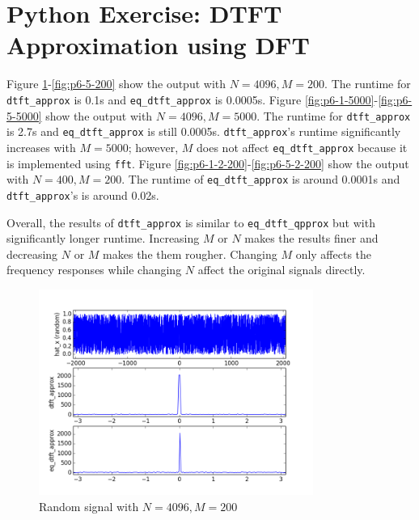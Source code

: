 \section{Python Exercise: DTFT Approximation using DFT}\label{sec:p6}
Figure \ref{fig:p6-1-200}-\ref{fig:p6-5-200} show the output with $N=4096, M=200$. The runtime for \texttt{dtft\_approx} is 0.1s and \texttt{eq\_dtft\_approx} is 0.0005s. Figure \ref{fig:p6-1-5000}-\ref{fig:p6-5-5000} show the output with $N=4096, M=5000$. The runtime for \texttt{dtft\_approx} is 2.7s and \texttt{eq\_dtft\_approx} is still 0.0005s. \texttt{dtft\_approx}'s runtime significantly increases with $M=5000$; however, $M$ does not affect \texttt{eq\_dtft\_approx} because it is implemented using \texttt{fft}. Figure \ref{fig:p6-1-2-200}-\ref{fig:p6-5-2-200} show the output with $N=400, M=200$. The runtime of \texttt{eq\_dtft\_approx} is around 0.0001s and \texttt{dtft\_approx}'s is around 0.02s.

Overall, the results of \texttt{dtft\_approx} is similar to \texttt{eq\_dtft\_qpprox} but with significantly longer runtime. Increasing $M$ or $N$ makes the results  finer and decreasing $N$ or $M$ makes the them rougher. Changing $M$ only affects the frequency responses while changing $N$ affect the original signals directly.

\begin{figure}[htbp]
	\centering
	\includegraphics[width=0.8\textwidth]{images/p6-1-200}
	\caption{Random signal with $N=4096, M=200$}
	\label{fig:p6-1-200}
\end{figure}

